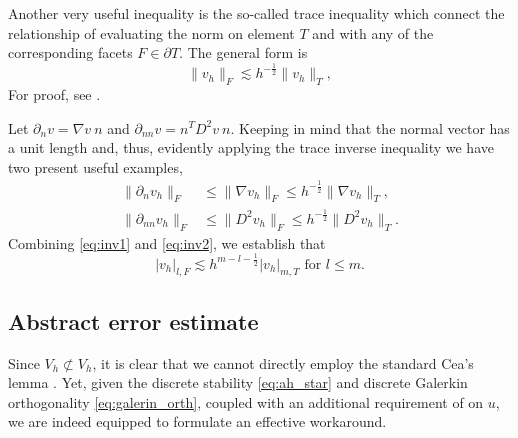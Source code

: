 \documentclass[11pt]{article}
\theoremstyle{remark}
\newcommand{\abs}[1]{\left\lvert #1 \right\rvert}
\renewcommand{\le}{\leqslant}
\numberwithin{equation}{section}
\begin{document}
Another very useful inequality is the so-called trace inequality which connect the relationship of evaluating the norm on element $ T $ and with any of the corresponding facets $F \in \partial T$. The general form is
\begin{equation}
    \label{eq:inv2}
\| v_{h} \|_{F   }^{  }  \lesssim
h^{-\frac{1}{2}} \| v_{h} \|_{ T  }^{  },
\end{equation}
For proof, see \cite[Lemma 12.8]{ErnGuermond2021}.

Let $\partial _{n} v = \nabla v \ n$ and $\partial_{nn} v = n^{T} D^2 v \ n $. Keeping in mind that the normal vector has a unit length and, thus, evidently applying the
trace inverse inequality we have two present useful examples,
\begin{equation}
    \label{eq:fund_inv_est}
\begin{split}
    \| \partial _{n} v_{h} \|_{F  }^{  }  & \le \| \nabla v_{h} \|_{F  }^{  }  \le h^{-\frac{1}{2}} \| \nabla  v_{h} \|_{T  }^{  },  \\
    \| \partial _{nn} v_{h} \|_{ F }^{  } & \le  \| D^2 v_{h} \|_{ F }^{  }   \le  h^{-\frac{1}{2}} \| D^2 v_{h} \|_{ T }^{  }.
\end{split}
\end{equation}
Combining \eqref{eq:inv1} and \eqref{eq:inv2}, we establish that
\begin{equation}
    \label{eq:general}
\abs{ v_{h} }_{l,F}  \lesssim h^{m-l - \frac{1}{2}} \abs{ v_{h} }_{m, T}
\text{ for } l \le m.
\end{equation}

\subsection{Abstract error estimate}%
\label{sub:ceas_lemma}

Since $V_{h} \not \subset V_{h}$, it is clear that we cannot directly employ the standard Cea's lemma \cite[p. 66]{quartdiff}. Yet, given the discrete stability \eqref{eq:ah_star} and discrete Galerkin orthogonality \eqref{eq:galerin_orth}, coupled with an additional
requirement of on $u$, we are indeed equipped to formulate an effective workaround.
\end{document}

